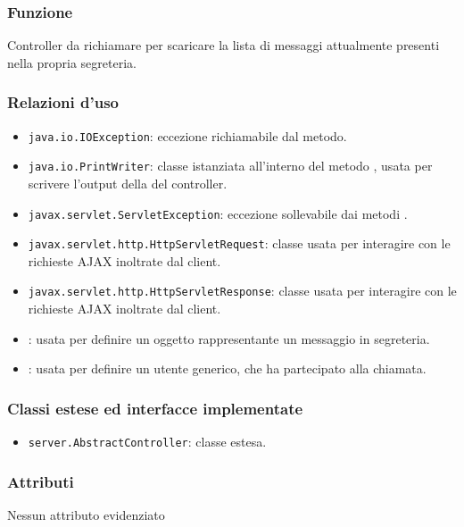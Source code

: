 
\subsubsection*{Funzione}
Controller da richiamare per scaricare la lista di messaggi attualmente presenti nella propria segreteria.

\subsubsection*{Relazioni d'uso}
\begin{itemize}
	\item \texttt{java.io.IOException}: eccezione richiamabile dal metodo.
	\item \texttt{java.io.PrintWriter}: classe istanziata all'interno del metodo , usata per scrivere l'output della del controller.
	\item \texttt{javax.servlet.ServletException}: eccezione sollevabile dai metodi .
	\item \texttt{javax.servlet.http.HttpServletRequest}: classe usata per interagire con le richieste AJAX inoltrate dal client.
	\item \texttt{javax.servlet.http.HttpServletResponse}: classe usata per interagire con le richieste AJAX inoltrate dal client.
	\item {}: usata per definire un oggetto rappresentante un messaggio in segreteria.
	\item {}: usata per definire un utente generico, che ha partecipato alla chiamata.
\end{itemize}

\subsubsection*{Classi estese ed interfacce implementate}
\begin{itemize}
	\item \texttt{server.AbstractController}: classe estesa.
\end{itemize}

\subsubsection*{Attributi}

Nessun attributo evidenziato

